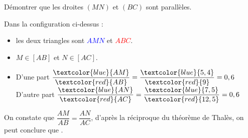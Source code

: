 \begin{methode*1}
\begin{minipage}{8cm}
                Démontrer que les droites $(MN)$ et $(BC)$ sont parallèles.
            \end{minipage}
            
            \correction
            Dans la configuration ci-dessus : 
            \begin{itemize}               
                \item les deux triangles sont \textcolor{blue}{$AMN$} et \textcolor{red}{$ABC$}.
                \item $M \in [AB]$ et $N \in [AC]$.
                \medskip
                \item D'une part $\dfrac{\textcolor{blue}{AM}}{\textcolor{red}{AB}} = \dfrac{\textcolor{blue}{5,4}}{\textcolor{red}{9}}=0,6$
                \hfill
                D'autre part $\dfrac{\textcolor{blue}{AN}}{\textcolor{red}{AC}} = \dfrac{\textcolor{blue}{7,5}}{\textcolor{red}{12,5}}=0,6$
            \end{itemize}
            On constate que $\dfrac{AM}{AB} = \dfrac{AN}{AC}$, d'après la réciproque du théorème de Thalès, on peut conclure que .
        \end{methode*1}
